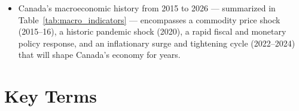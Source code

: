 \begin{itemize}
  \item Canada's macroeconomic history from 2015 to 2026 --- summarized in
        Table~\ref{tab:macro_indicators} --- encompasses a commodity price
        shock (2015--16), a historic pandemic shock (2020), a rapid fiscal
        and monetary policy response, and an inflationary surge and
        tightening cycle (2022--2024) that will shape Canada's economy
        for years.
\end{itemize}

\section*{Key Terms}

